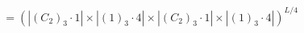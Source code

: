 \documentclass[preview]{standalone}
\begin{document}
\begin{align*}
\quad\\   &= \left(\left|(C_2)_3\cdot 1\right| \times \left|(1)_3\cdot 4\right|\times \left|(C_2)_3\cdot 1\right| \times \left|(1)_3\cdot 4\right|\right)^{L/4}
\end{align*}
\end{document}

